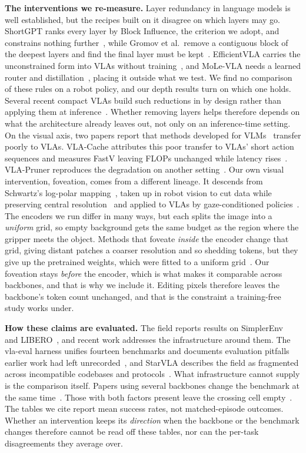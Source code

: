 \textbf{The interventions we re-measure.} Layer redundancy in language models
is well established, but the recipes built on it disagree on which layers may
go. ShortGPT ranks every layer by Block Influence, the criterion we adopt, and
constrains nothing further~\cite{shortgpt}, while Gromov et al.\ remove a
contiguous block of the deepest layers and find the final layer must be
kept~\cite{gromov}. EfficientVLA carries the unconstrained form into VLAs
without training~\cite{efficientvla}, and MoLe-VLA needs a learned router and
distillation~\cite{molevla}, placing it outside what we test. We find no
comparison of these rules on a robot policy, and our depth results turn on
which one holds. Several recent compact VLAs build such reductions in by
design rather than applying them at inference~\cite{flower, smolvla,
turbovla}. Whether removing layers helps therefore depends on what the
architecture already leaves out, not only on an inference-time setting. On the
visual axis, two papers report that methods developed for VLMs~\cite{fastv,
sparsevlm, tome} transfer poorly to VLAs. VLA-Cache attributes this poor
transfer to VLAs' short action sequences and measures FastV leaving FLOPs
unchanged while latency rises~\cite{vlacache}. VLA-Pruner reproduces the
degradation on another setting~\cite{vlapruner}. Our own visual intervention,
foveation, comes from a different lineage. It descends from Schwartz's
log-polar mapping~\cite{schwartz}, taken up in robot vision to cut data while
preserving central resolution~\cite{traver} and applied to VLAs by
gaze-conditioned policies~\cite{gazereg, lookfocusact}. The encoders we run
differ in many ways, but each splits the image into a \emph{uniform} grid, so
empty background gets the same budget as the region where the gripper meets
the object. Methods that foveate \emph{inside} the encoder change that grid,
giving distant patches a coarser resolution and so shedding tokens, but they
give up the pretrained weights, which were fitted to a uniform
grid~\cite{lookfocusact}. Our foveation stays \emph{before} the encoder, which
is what makes it comparable across backbones, and that is why we include it.
Editing pixels therefore leaves the backbone's token count unchanged, and that
is the constraint a training-free study works under.

\textbf{How these claims are evaluated.} The field reports results on
SimplerEnv~\cite{simplerenv} and LIBERO~\cite{libero}, and recent work
addresses the infrastructure around them. The vla-eval harness unifies
fourteen benchmarks and documents evaluation pitfalls earlier work had left
unrecorded~\cite{vlaeval}, and StarVLA describes the field as fragmented across
incompatible codebases and protocols~\cite{starvla}. What infrastructure
cannot supply is the comparison itself. Papers using several backbones change
the benchmark at the same time~\cite{vlacache, specprune, vlaiap}. Those with
both factors present leave the crossing cell empty~\cite{gazereg, vlapruner}.
The tables we cite report mean success rates, not matched-episode outcomes.
Whether an intervention keeps its \emph{direction} when the backbone or the
benchmark changes therefore cannot be read off these tables, nor can the
per-task disagreements they average over.

